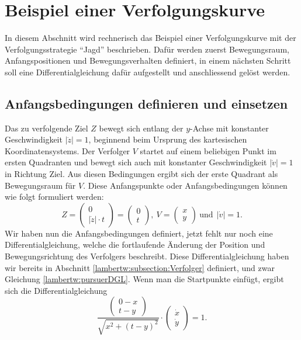 %
%
%
\section{Beispiel einer Verfolgungskurve
	\label{lambertw:section:teil4}}
In diesem Abschnitt wird rechnerisch das Beispiel einer Verfolgungskurve mit der Verfolgungsstrategie ``Jagd'' beschrieben. Dafür werden zuerst Bewegungsraum, Anfangspositionen und Bewegungsverhalten definiert, in einem nächsten Schritt soll eine Differentialgleichung dafür aufgestellt und anschliessend gelöst werden.

\subsection{Anfangsbedingungen definieren und einsetzen
	\label{lambertw:subsection:Anfangsbedingungen}}
Das zu verfolgende Ziel \(Z\) bewegt sich entlang der \(y\)-Achse mit konstanter Geschwindigkeit \(|\dot{z}| = 1\), beginnend beim Ursprung des kartesischen Koordinatensystems. Der Verfolger \(V\) startet auf einem beliebigen Punkt im ersten Quadranten und bewegt sich auch mit konstanter Geschwindigkeit \(|\dot{v}| = 1\) in Richtung Ziel. Aus diesen Bedingungen ergibt sich der erste Quadrant als Bewegungsraum für \(V\). Diese Anfangspunkte oder Anfangsbedingungen können wie folgt formuliert werden:
\begin{equation}
	Z
	=
	\left( \begin{array}{c} 0 \\ |\dot{z}| \cdot t \end{array} \right)
	=
	\left( \begin{array}{c} 0 \\ t \end{array} \right)
	,\:
	V
	=
	\left( \begin{array}{c} x \\ y \end{array} \right)
	\:\text{und}\:\:
	|\dot{v}|
	=
	1.
	\label{lambertw:Anfangsbed}
\end{equation}
Wir haben nun die Anfangsbedingungen definiert, jetzt fehlt nur noch eine Differentialgleichung, welche die fortlaufende Änderung der Position und Bewegungsrichtung des Verfolgers beschreibt. 
Diese Differentialgleichung haben wir bereits in Abschnitt \ref{lambertw:subsection:Verfolger} definiert, und zwar Gleichung \eqref{lambertw:pursuerDGL}. Wenn man die Startpunkte einfügt, ergibt sich die Differentialgleichung
\begin{equation}
	\frac{\left( \begin{array}{c} 0-x \\ t-y \end{array} \right)}{\sqrt{x^2 + (t-y)^2}}
	\cdot
	\left(\begin{array}{c} \dot{x} \\ \dot{y} \end{array}\right)
	=
	1.
	\label{lambertw:eqMitAnfangsbed}
\end{equation}

